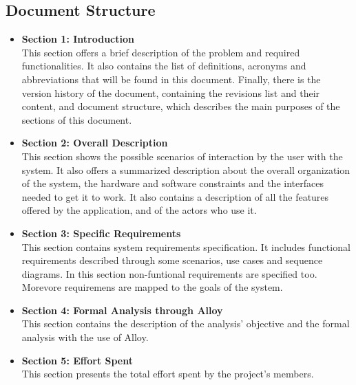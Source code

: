 \subsection{Document Structure}
\begin{itemize}
        \item \textbf{Section 1: Introduction} \\This section offers a brief description of the problem and required functionalities.
        It also contains the list of definitions, acronyms and abbreviations that will be found in this document.
        Finally, there is the version history of the document, containing the revisions list and their content, and document structure, 
        which describes the main purposes of the sections of this document.
        \item \textbf{Section 2: Overall Description} \\This section shows the possible scenarios of interaction by the user with the system. It also offers a summarized description about the overall organization of the system, the hardware and software constraints and the interfaces needed to get it to work.
        It also contains a description of all the features offered by the application, and of the actors who use it.
        
        \item \textbf{Section 3: Specific Requirements} \\This section contains system requirements specification. It includes functional requirements described through some scenarios, use cases and sequence diagrams. 
        In this section non-funtional requirements are specified too. Morevore requiremens are mapped to the goals of the system.

        \item \textbf{Section 4: Formal Analysis through Alloy} \\This section contains the description of the analysis' objective and the formal analysis with the use of Alloy.
        \item \textbf{Section 5: Effort Spent} \\This section presents the total effort spent by the project's members.
\end{itemize}

